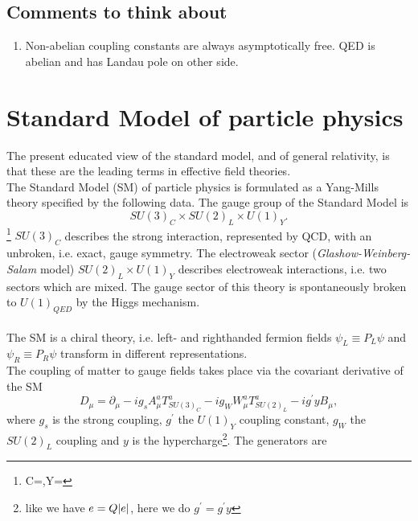 \subsection{Comments to think about}
\begin{enumerate}
	\item Non-abelian coupling constants are always asymptotically free. QED is abelian and has Landau pole on other side.
\end{enumerate}

\section{Standard Model of particle physics}
\label{sec:sm}
The present educated view of the standard model, and of general
relativity, is that these are the leading terms in effective
field theories.\\
The Standard Model (SM) of particle physics is formulated as a Yang-Mills theory specified by the following data.
The gauge group of the Standard Model is 
\begin{equation}
	SU(3)_C \times SU(2)_L \times U(1)_Y.
\end{equation}
\footnote{C=,Y=}
 $SU(3)_C$ describes the strong interaction, represented by QCD, with an unbroken, i.e. exact, gauge symmetry. The electroweak sector (\emph{Glashow-Weinberg-Salam} model) $SU(2)_L\times U(1)_Y$ describes electroweak interactions, i.e. two sectors which are mixed. The gauge sector of this theory is spontaneously broken to $U(1)_{QED}$ by the Higgs mechanism.\\
 \\
  The SM is a chiral theory, i.e.
 left- and righthanded fermion fields $ψ_L ≡ P_L ψ$ and $ψ_R ≡ P_R ψ$ transform in different representations. 
\\
The coupling of matter to gauge fields takes place via the covariant derivative of the SM
\begin{equation}
	D_\mu = \partial_\mu - i g_s A^a_\mu T^a_{SU(3)_C} - i g_W W^a_\mu T^a_{SU(2)_L} -i g^\prime y B_\mu,
\end{equation}
where $g_s$ is the strong coupling, $g^\prime$ the $U(1)_Y$ coupling constant, $g_W$ the $SU(2)_L$ coupling and $y$ is the hypercharge\footnote{like we have $e=Q \abs{e}$, here we do $g^\prime = g^\prime y$}. The generators are
